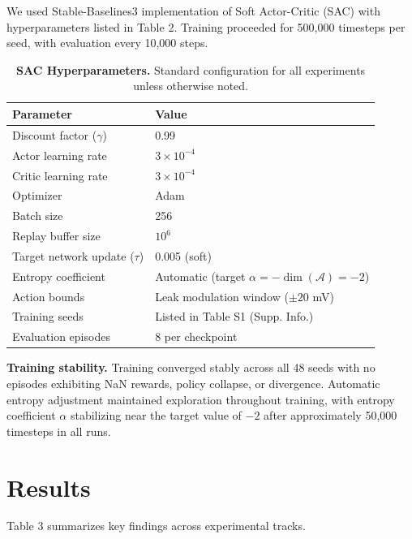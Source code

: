 \documentclass[10pt,letterpaper]{article}
\begin{document}
We used Stable-Baselines3 \cite{raffin2021stable} implementation of Soft Actor-Critic (SAC) \cite{haarnoja2018soft} with hyperparameters listed in Table 2. Training proceeded for 500,000 timesteps per seed, with evaluation every 10,000 steps.

\begin{table}[h]
\caption{\textbf{SAC Hyperparameters.} Standard configuration for all experiments unless otherwise noted.}
\begin{tabular}{ll}
\hline
\textbf{Parameter} & \textbf{Value} \\
\hline
Discount factor ($\gamma$) & 0.99 \\
Actor learning rate & $3 \times 10^{-4}$ \\
Critic learning rate & $3 \times 10^{-4}$ \\
Optimizer & Adam \\
Batch size & 256 \\
Replay buffer size & $10^6$ \\
Target network update ($\tau$) & 0.005 (soft) \\
Entropy coefficient & Automatic (target $\alpha = -\dim(\mathcal{A}) = -2$) \\
Action bounds & Leak modulation window ($\pm 20$ mV) \\
Training seeds & Listed in Table S1 (Supp. Info.) \\
Evaluation episodes & 8 per checkpoint \\
\hline
\end{tabular}
\label{tab:hyperparams}
\end{table}

\textbf{Training stability.} Training converged stably across all 48 seeds with no episodes exhibiting NaN rewards, policy collapse, or divergence. Automatic entropy adjustment maintained exploration throughout training, with entropy coefficient $\alpha$ stabilizing near the target value of $-2$ after approximately 50,000 timesteps in all runs.

\section*{Results}

Table 3 summarizes key findings across experimental tracks.
\end{document}
